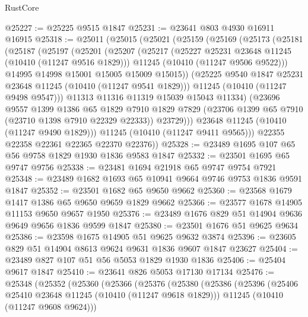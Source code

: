 \begin{lexlean}{RustCore}
\begin{coremodule}
@25227 := @25225 @9515 @1847
@25231 := @23641 @803 @4930 @16911 @16915
@25318 := @25011
    (@25015
      (@25021
        (@25159
          (@25169
            (@25173
              (@25181
                (@25187
                  (@25197
                    (@25201
                      (@25207
                        (@25217
                          (@25227 @25231 @23648 @11245 (@10410 (@11247 @9516 @1829)))
                          @11245
                          (@10410 (@11247 @9506 @9522)))
                        @14995
                        @14998
                        @15001
                        @15005
                        @15009
                        @15015))
                    (@25225 @9540 @1847 @25231 @23648 @11245 (@10410 (@11247 @9541 @1829)))
                    @11245
                    (@10410 (@11247 @9498 @9547)))
                  @11313
                  @11316
                  @11319
                  @15039
                  @15043
                  @11334)
                (@23696
                  @9557
                  @1399
                  @1386
                  @65
                  @1829
                  @7910
                  @1829
                  @7829
                  (@23706 @1399 @65 @7910 (@23710 @1398 @7910 @22329 @22333))
                  @23729)))
            @23648
            @11245
            (@10410 (@11247 @9490 @1829)))
          @11245
          (@10410 (@11247 @9411 @9565)))
        @22355
        @22358
        @22361
        @22365
        @22370
        @22376))
@25328 := @23489 @1695 @107 @65 @56 @9758 @1829 @1930 @1836 @9583 @1847
@25332 := @23501 @1695 @65 @9747 @9756
@25338 := @23481 @1694 @21918 @65 @9747 @9754 @7921
@25348 := @23489 @1682 @1693 @65 @10941 @9664 @9746 @9753 @1836 @9591 @1847
@25352 := @23501 @1682 @65 @9650 @9662
@25360 := @23568 @1679 @1417 @1386 @65 @9650 @9659 @1829 @9662
@25366 := @23577 @1678 @14905 @11153 @9650 @9657 @1950
@25376 := @23489 @1676 @829 @51 @14904 @9636 @9649 @9656 @1836 @9599 @1847
@25380 := @23501 @1676 @51 @9625 @9634
@25386 := @23598 @1675 @14905 @51 @9625 @9632 @3874
@25396 := @23605 @829 @51 @14904 @8613 @9624 @9631 @1836 @9607 @1847 @23627
@25404 := @23489 @827 @107 @51 @56 @5053 @1829 @1930 @1836
@25406 := @25404 @9617 @1847
@25410 := @23641 @826 @5053 @17130 @17134
@25476 := @25348
    (@25352
      (@25360
        (@25366
          (@25376
            (@25380
              (@25386
                (@25396
                  (@25406 @25410 @23648 @11245 (@10410 (@11247 @9618 @1829)))
                  @11245
                  (@10410 (@11247 @9608 @9624)))

\end{coremodule}
\end{lexlean}
